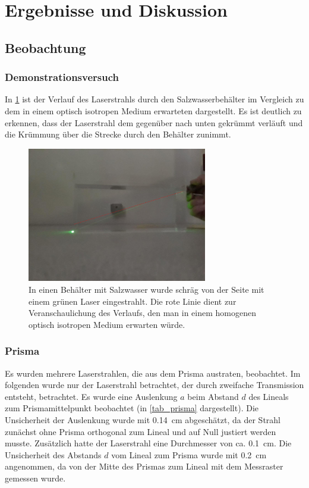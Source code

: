 \documentclass[
	a4paper,
	12pt,
	pagesize,
	ngerman
]{scrartcl}
\begin{document}
	\section{Ergebnisse und Diskussion}
	

	\subsection{Beobachtung}
	\subsubsection{Demonstrationsversuch}
	In \cref{fig_salzwasser} ist der Verlauf des Laserstrahls durch den Salzwasserbehälter im Vergleich zu dem in einem optisch isotropen Medium erwarteten dargestellt.
	Es ist deutlich zu erkennen, dass der Laserstrahl dem gegenüber nach unten gekrümmt verläuft und die Krümmung über die Strecke durch den Behälter zunimmt.

	\begin{figure}[H]
		\includegraphics[width=0.7\textwidth]{Salzwasser}
		\centering
		\caption{In einen Behälter mit Salzwasser wurde schräg von der Seite mit einem grünen Laser eingestrahlt. Die rote Linie dient zur Veranschaulichung des Verlaufs, den man in einem homogenen optisch isotropen Medium erwarten würde.} 
		\label{fig_salzwasser}
		\centering
	\end{figure}
	
	\subsubsection{Prisma}
	Es wurden mehrere Laserstrahlen, die aus dem Prisma austraten, beobachtet.
	Im folgenden wurde nur der Laserstrahl betrachtet, der durch zweifache Transmission entsteht, betrachtet. %
	Es wurde eine Auslenkung $a$ beim Abstand $d$ des Lineals zum Prismamittelpunkt beobachtet (in \cref{tab_prisma} dargestellt).
	Die Unsicherheit der Auslenkung wurde mit \SI{0,14}{cm} abgeschätzt, da der Strahl zunächst ohne Prisma orthogonal zum Lineal und auf Null justiert werden musste. 
	Zusätzlich hatte der Laserstrahl eine Durchmesser von ca. \SI{0,1}{cm}.
	Die Unsicherheit des Abstands $d$ vom Lineal zum Prisma wurde mit \SI{0,2}{cm} angenommen, da von der Mitte des Prismas zum Lineal mit dem Messraster gemessen wurde.
\end{document}
